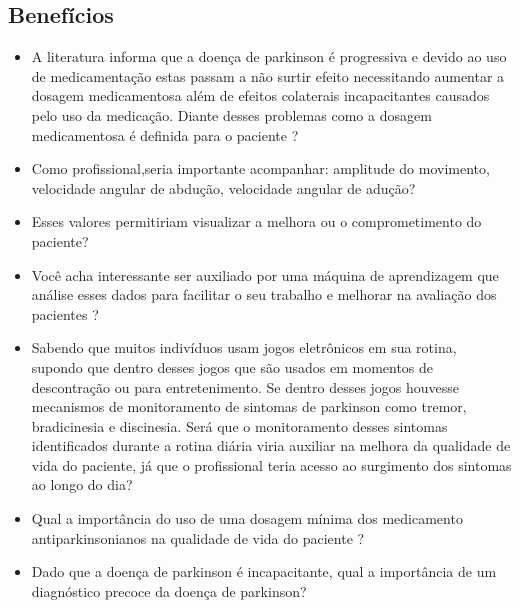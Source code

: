 \subsection{Benefícios}
\begin{itemize}
    \item A literatura informa que a doença de parkinson é progressiva e devido ao uso de medicamentação estas passam a não surtir efeito necessitando aumentar a dosagem medicamentosa além de efeitos colaterais incapacitantes causados pelo uso da medicação. Diante desses problemas como a dosagem medicamentosa é definida para o paciente ?
		\item Como profissional,seria importante acompanhar: amplitude do movimento, velocidade angular de abdução, velocidade angular de adução?
		\item Esses valores permitiriam visualizar a melhora ou o comprometimento do paciente?
		\item Você acha interessante ser auxiliado por uma máquina de aprendizagem que análise esses dados para facilitar o seu trabalho e melhorar na avaliação dos pacientes ?
		\item Sabendo que muitos indivíduos usam jogos eletrônicos em sua rotina, supondo que dentro desses jogos que são usados em momentos de descontração ou para entretenimento. Se dentro desses jogos houvesse mecanismos de monitoramento de sintomas de parkinson como tremor, bradicinesia e discinesia. Será que o monitoramento desses sintomas identificados durante a rotina diária viria auxiliar na melhora da qualidade de vida do paciente, já que o profissional teria acesso ao surgimento dos sintomas ao longo do dia?
		\item Qual a importância do uso de uma dosagem mínima dos medicamento antiparkinsonianos na qualidade de vida do paciente ?				
		\item Dado que a doença de parkinson é incapacitante, qual a importância de um diagnóstico precoce da doença de parkinson? 
\end{itemize}

